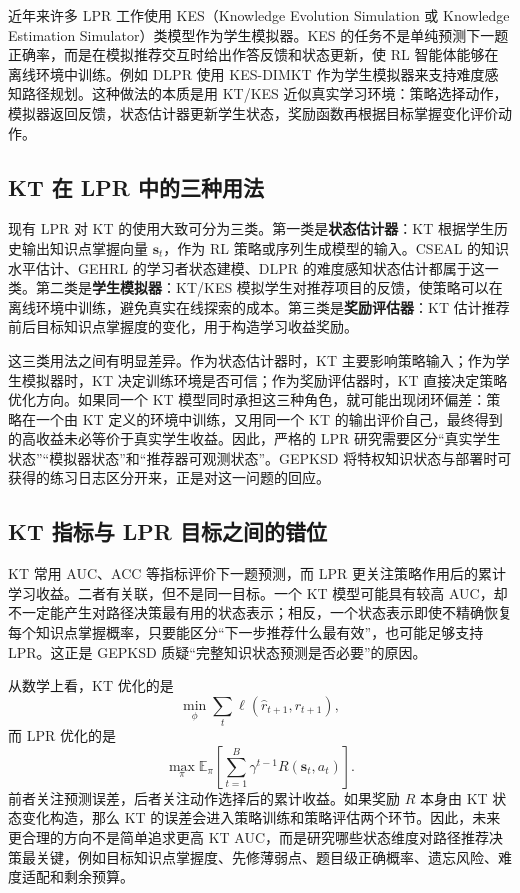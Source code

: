 \documentclass[UTF8,a4paper,zihao=-4]{ctexart}
\begin{document}
近年来许多 LPR 工作使用 KES（Knowledge Evolution Simulation 或 Knowledge Estimation Simulator）类模型作为学生模拟器。KES 的任务不是单纯预测下一题正确率，而是在模拟推荐交互时给出作答反馈和状态更新，使 RL 智能体能够在离线环境中训练。例如 DLPR 使用 KES-DIMKT 作为学生模拟器来支持难度感知路径规划\cite{Zhang2024DLPR}。这种做法的本质是用 KT/KES 近似真实学习环境：策略选择动作，模拟器返回反馈，状态估计器更新学生状态，奖励函数再根据目标掌握变化评价动作。

\subsection{KT 在 LPR 中的三种用法}

现有 LPR 对 KT 的使用大致可分为三类。第一类是\textbf{状态估计器}：KT 根据学生历史输出知识点掌握向量 $\mathbf{s}_t$，作为 RL 策略或序列生成模型的输入。CSEAL 的知识水平估计、GEHRL 的学习者状态建模、DLPR 的难度感知状态估计都属于这一类。第二类是\textbf{学生模拟器}：KT/KES 模拟学生对推荐项目的反馈，使策略可以在离线环境中训练，避免真实在线探索的成本。第三类是\textbf{奖励评估器}：KT 估计推荐前后目标知识点掌握度的变化，用于构造学习收益奖励。

这三类用法之间有明显差异。作为状态估计器时，KT 主要影响策略输入；作为学生模拟器时，KT 决定训练环境是否可信；作为奖励评估器时，KT 直接决定策略优化方向。如果同一个 KT 模型同时承担这三种角色，就可能出现闭环偏差：策略在一个由 KT 定义的环境中训练，又用同一个 KT 的输出评价自己，最终得到的高收益未必等价于真实学生收益。因此，严格的 LPR 研究需要区分“真实学生状态”“模拟器状态”和“推荐器可观测状态”。GEPKSD 将特权知识状态与部署时可获得的练习日志区分开来，正是对这一问题的回应\cite{Li2024GEPKSD}。

\subsection{KT 指标与 LPR 目标之间的错位}

KT 常用 AUC、ACC 等指标评价下一题预测，而 LPR 更关注策略作用后的累计学习收益。二者有关联，但不是同一目标。一个 KT 模型可能具有较高 AUC，却不一定能产生对路径决策最有用的状态表示；相反，一个状态表示即使不精确恢复每个知识点掌握概率，只要能区分“下一步推荐什么最有效”，也可能足够支持 LPR。这正是 GEPKSD 质疑“完整知识状态预测是否必要”的原因。

从数学上看，KT 优化的是
\begin{equation}
\min_{\phi}\sum_t \ell(\hat{r}_{t+1},r_{t+1}),
\end{equation}
而 LPR 优化的是
\begin{equation}
\max_{\pi}\mathbb{E}_{\pi}\left[\sum_{t=1}^{B}\gamma^{t-1}R(\mathbf{s}_t,a_t)\right].
\end{equation}
前者关注预测误差，后者关注动作选择后的累计收益。如果奖励 $R$ 本身由 KT 状态变化构造，那么 KT 的误差会进入策略训练和策略评估两个环节。因此，未来更合理的方向不是简单追求更高 KT AUC，而是研究哪些状态维度对路径推荐决策最关键，例如目标知识点掌握度、先修薄弱点、题目级正确概率、遗忘风险、难度适配和剩余预算。
\end{document}
